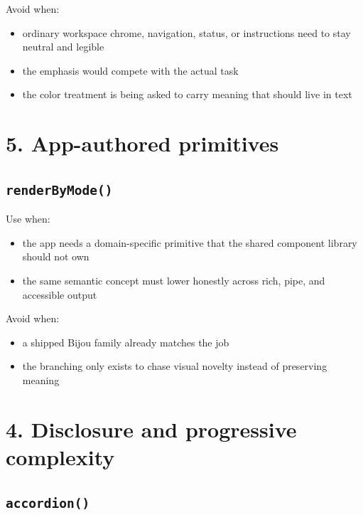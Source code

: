 Avoid when:

\begin{itemize}
\tightlist
\item
  ordinary workspace chrome, navigation, status, or instructions need to stay neutral and legible
\item
  the emphasis would compete with the actual task
\item
  the color treatment is being asked to carry meaning that should live in text
\end{itemize}

\section{5. App-authored primitives}\label{record-023-app-authored-primitives}

\subsection{\texorpdfstring{\texttt{r\allowbreak{}e\allowbreak{}n\allowbreak{}d\allowbreak{}e\allowbreak{}r\allowbreak{}B\allowbreak{}y\allowbreak{}M\allowbreak{}o\allowbreak{}d\allowbreak{}e\allowbreak{}(\allowbreak{})}}{}}\label{record-023-renderbymode}

Use when:

\begin{itemize}
\tightlist
\item
  the app needs a domain-specific primitive that the shared component library should not own
\item
  the same semantic concept must lower honestly across rich, pipe, and accessible output
\end{itemize}

Avoid when:

\begin{itemize}
\tightlist
\item
  a shipped Bijou family already matches the job
\item
  the branching only exists to chase visual novelty instead of preserving meaning
\end{itemize}

\section{4. Disclosure and progressive complexity}\label{record-023-disclosure-and-progressive-complexity}

\subsection{\texorpdfstring{\texttt{a\allowbreak{}c\allowbreak{}c\allowbreak{}o\allowbreak{}r\allowbreak{}d\allowbreak{}i\allowbreak{}o\allowbreak{}n\allowbreak{}(\allowbreak{})}}{}}\label{record-023-accordion}

